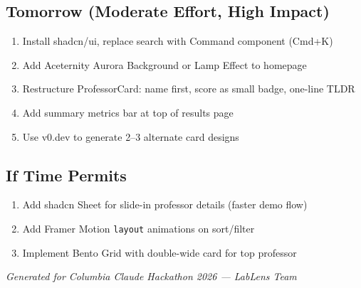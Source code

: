 \documentclass[11pt,letterpaper]{article}
\begin{document}
\subsection{Tomorrow (Moderate Effort, High Impact)}
\begin{enumerate}[nosep, start=6]
    \item Install shadcn/ui, replace search with Command component (Cmd+K)
    \item Add Aceternity Aurora Background or Lamp Effect to homepage
    \item Restructure ProfessorCard: name first, score as small badge, one-line TLDR
    \item Add summary metrics bar at top of results page
    \item Use v0.dev to generate 2--3 alternate card designs
\end{enumerate}

\subsection{If Time Permits}
\begin{enumerate}[nosep, start=11]
    \item Add shadcn Sheet for slide-in professor details (faster demo flow)
    \item Add Framer Motion \texttt{layout} animations on sort/filter
    \item Implement Bento Grid with double-wide card for top professor
\end{enumerate}

\vfill
\begin{center}
    \small\itshape
    Generated for Columbia Claude Hackathon 2026 --- LabLens Team
\end{center}
\end{document}
